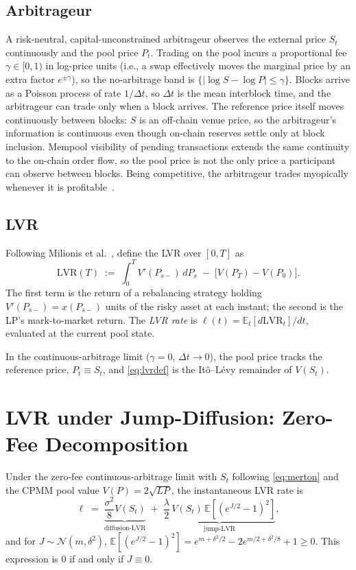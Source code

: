 \documentclass[runningheads]{llncs}
\newcommand{\E}{\mathbb{E}}
\newcommand{\dt}{\Delta t}
\newcommand{\1}{\mathbf{1}}
\begin{document}
\subsection{Arbitrageur}
A risk-neutral, capital-unconstrained arbitrageur observes the external price $S_t$ continuously and the pool price $P_t$. Trading on the pool incurs a proportional fee $\gamma \in [0,1)$ in log-price units (i.e., a swap effectively moves the marginal price by an extra factor $e^{\pm\gamma}$), so the no-arbitrage band is $\{|\log S - \log P| \le \gamma\}$. Blocks arrive as a Poisson process of rate $1/\dt$, so $\dt$ is the mean interblock time, and the arbitrageur can trade only when a block arrives. The reference price itself moves continuously between blocks: $S$ is an off-chain venue price, so the arbitrageur's information is continuous even though on-chain reserves settle only at block inclusion. Mempool visibility of pending transactions extends the same continuity to the on-chain order flow, so the pool price is not the only price a participant can observe between blocks. Being competitive, the arbitrageur trades myopically whenever it is profitable~\cite[\S3]{milionis2023automated}.

\subsection{LVR}
Following Milionis et al.~\cite{milionis2022automated}, define the LVR over $[0,T]$ as
\begin{equation}\label{eq:lvrdef}
\mathrm{LVR}(T) \;:=\; \int_0^T V'(P_{s-}) \, dP_s \;-\; \big[V(P_T) - V(P_0)\big].
\end{equation}
The first term is the return of a rebalancing strategy holding $V'(P_{s-}) = x(P_{s-})$ units of the risky asset at each instant; the second is the LP's mark-to-market return. The \emph{LVR rate} is $\ell(t) = \E_t[d\mathrm{LVR}_t]/dt$, evaluated at the current pool state.

In the continuous-arbitrage limit ($\gamma = 0$, $\dt \to 0$), the pool price tracks the reference price, $P_t \equiv S_t$, and \eqref{eq:lvrdef} is the It\^o--L\'evy remainder of $V(S_t)$.

\section{LVR under Jump-Diffusion: Zero-Fee Decomposition}\label{sec:zerofees}

\begin{theorem}\label{thm:decomp}
Under the zero-fee continuous-arbitrage limit with $S_t$ following \eqref{eq:merton} and the CPMM pool value $V(P) = 2\sqrt{LP}$, the instantaneous LVR rate is
\begin{equation}\label{eq:thm1}
\ell \;=\; \underbrace{\frac{\sigma^2}{8} V(S_t)}_{\text{diffusion-LVR}} \;+\; \underbrace{\frac{\lambda}{2}\,V(S_t)\,\E[(e^{J/2} - 1)^2]}_{\text{jump-LVR}},
\end{equation}
and for $J \sim \mathcal{N}(m, \delta^2)$, $\E[(e^{J/2} - 1)^2] = e^{m + \delta^2/2} - 2 e^{m/2 + \delta^2/8} + 1 \geq 0$.
This expression is $0$ if and only if $J \equiv 0$.
\end{theorem}
\end{document}

